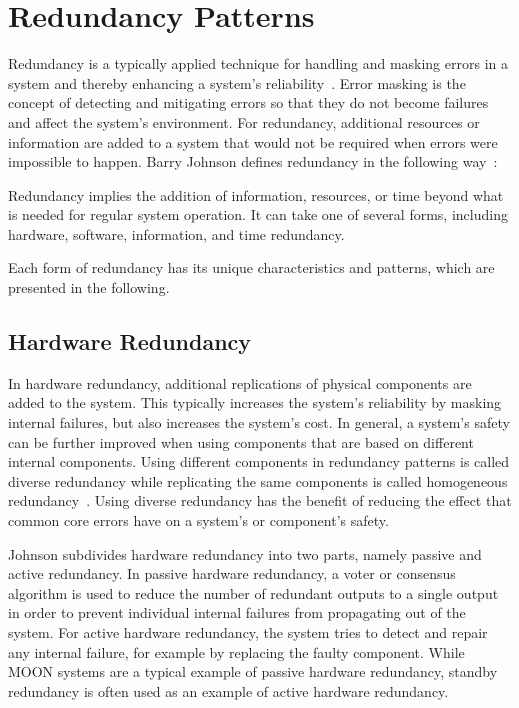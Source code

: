 \section{Redundancy Patterns}
\label{sec:redundancyPatterns}
Redundancy is a typically applied technique for handling and masking errors in a system and thereby enhancing a system's reliability~\cite{TanenbaumSteen07}.
Error masking is the concept of detecting and mitigating errors so that they do not become failures and affect the system's environment.
For redundancy, additional resources or information are added to a system that would not be required when errors were impossible to happen.
Barry Johnson defines redundancy in the following way~\cite{BarryFaultToleranceAnalysis}:
\begin{definition}
Redundancy implies the addition of information, resources, or time beyond what is needed for regular system operation.
It can take one of several forms, including hardware, software, information, and time redundancy.
\end{definition}

Each form of redundancy has its unique characteristics and patterns, which are presented in the following.

\subsection{Hardware Redundancy}
In hardware redundancy, additional replications of physical components are added to the system.
This typically increases the system's reliability by masking internal failures, but also increases the system's cost.
In general, a system's safety can be further improved when using components that are based on different internal components.
Using different components in redundancy patterns is called diverse redundancy while replicating the same components is called homogeneous redundancy~\cite{HomogeneousRedundancyOuzineb}.
Using diverse redundancy has the benefit of reducing the effect that common core errors have on a system's or component's safety.

Johnson subdivides hardware redundancy into two parts, namely passive and active redundancy.
In passive hardware redundancy, a voter or consensus algorithm is used to reduce the number of redundant outputs to a single output in order to prevent individual internal failures from propagating out of the system.
For active hardware redundancy, the system tries to detect and repair any internal failure, for example by replacing the faulty component.
While \gls*{MOON} systems are a typical example of passive hardware redundancy, standby redundancy is often used as an example of active hardware redundancy.

